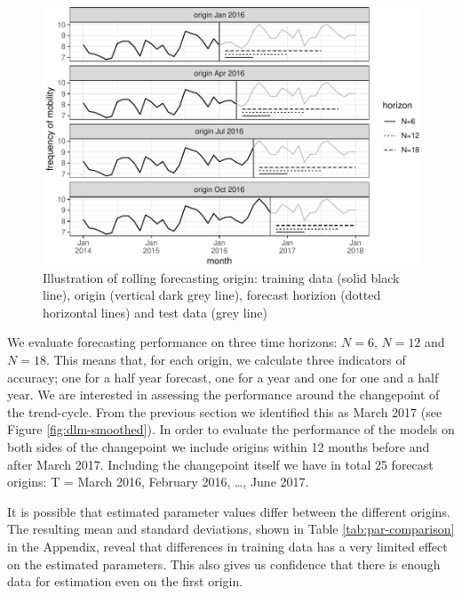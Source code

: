 \documentclass[12pt, a4paper]{article}
\begin{document}
\begin{figure}[H]
  \caption{\label{fig:rolling-forecast-example}Illustration of rolling
forecasting origin: training data (solid black line), origin (vertical
dark grey line), forecast horizion (dotted horizontal lines) and test
data (grey line)}
\centering
\includegraphics[scale = 0.8]{../figs/freq--rolling-forecast-example-1.pdf}

\end{figure}

We evaluate forecasting performance on three time horizons: $N=6$,
$N=12$ and $N=18$. This means that, for each origin, we calculate
three indicators of accuracy; one for a half year forecast, one for a
year and one for one and a half year. We are interested in assessing the
performance around the changepoint of the trend-cycle. From the previous
section we identified this as March 2017 (see Figure
\ref{fig:dlm-smoothed}). In order to evaluate the performance of the
models on both sides of the changepoint we include origins within 12
months before and after March 2017. Including the changepoint itself we
have in total 25 forecast origins: T = March 2016, February 2016,
\ldots{}, June 2017.

It is possible that estimated parameter values differ
between the different origins. The resulting mean and standard
deviations, shown in Table \ref{tab:par-comparison} in the Appendix,
reveal that differences in training data has a very limited effect on
the estimated parameters. This also gives us confidence that there is
enough data for estimation even on the first origin.
\end{document}
